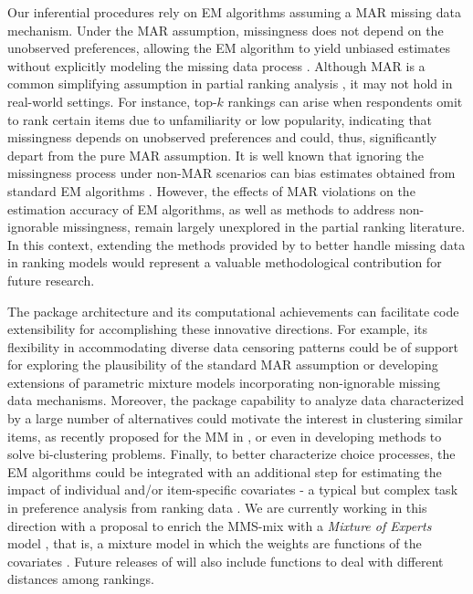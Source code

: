 Our inferential procedures rely on EM algorithms assuming a MAR missing data mechanism. Under the MAR assumption, missingness does not depend on the unobserved preferences, allowing the EM algorithm to yield unbiased estimates without explicitly modeling the missing data process \citep{rubin1976inference,little2019statistical}. Although MAR is a common simplifying assumption in partial ranking analysis \citep{beckett93maximum,Jacques2014,piancastelli2025time}, it may not hold in real-world settings. For instance, top-$k$ rankings can arise when respondents omit to rank certain items due to unfamiliarity or low popularity, indicating that missingness depends on unobserved preferences and could, thus, significantly depart from the pure MAR assumption. It is well known that ignoring the missingness process under non-MAR scenarios can bias estimates obtained from standard EM algorithms \citep{little2019statistical}. However, the effects of MAR violations on the estimation accuracy of EM algorithms, as well as methods to address non-ignorable missingness, remain largely unexplored in the partial ranking literature. In this context, extending the methods provided by  to better handle missing data in ranking models would represent a valuable methodological contribution for future research.

The package architecture and its computational achievements can facilitate code extensibility for accomplishing these innovative directions. For example, its flexibility in accommodating diverse data censoring patterns could be of support for exploring the plausibility of the standard MAR assumption or developing extensions of parametric mixture models incorporating non-ignorable missing data mechanisms. Moreover, the package capability to analyze data characterized by a large number of alternatives could motivate the interest in clustering similar items, as recently proposed for the MM in \citet{piancastelli}, or even in developing methods to solve bi-clustering problems.  Finally, to better characterize choice processes, the EM algorithms could be integrated with an additional step for estimating the impact of individual and/or item-specific covariates - a typical but complex task in preference analysis from ranking data \citep[see e.g.,][]{ gormley2008mixture,zhu21partition}.
We are currently working in this direction with a proposal to enrich the MMS-mix with a \textit{Mixture of Experts} model \citep{jacobs,jordan}, that is, a mixture model in which the weights are functions of the covariates \citep{crispinoMoE}. Future releases of  will also include functions to deal with different distances among rankings.

